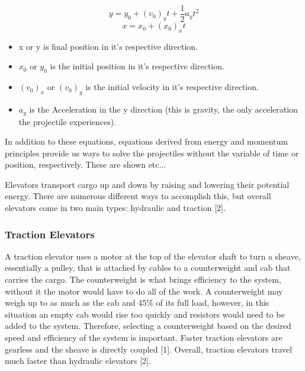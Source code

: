 \documentclass[fleqn,12pt]{project}
\begin{document}
\begin{equation}
	y = y_0 + (v_0)_yt + \frac{1}{2}a_yt^2
\label{eq:y}
\end{equation}
\begin{equation}
	x = x_0 + (x_0)_xt
\label{eq:x}
\end{equation}
\begin{itemize}
\item x or y is final position in it's respective direction.
\item $x_0$ or $y_0$ is the initial position in it's respective direction.
\item $(v_0)_x$ or $(v_0)_y$ is the initial velocity in it's respective direction.
\item $a_y$ is the Acceleration in the y direction (this is gravity, the only acceleration the projectile experiences).
\end{itemize}


In addition to these equations, equations derived from energy and momentum principles provide us ways to solve the projectiles without the variable of time or position, respectively. These are shown etc...

Elevators transport cargo up and down by raising and lowering their potential energy. There are numerous different ways to accomplish this, but overall elevators come in two main types: hydraulic and traction [2].

\subsubsection{Traction Elevators}
A traction elevator uses a motor at the top of the elevator shaft to turn a sheave, essentially a pulley, that is attached by cables to a counterweight and cab that carries the cargo. The counterweight is what brings efficiency to the system, without it the motor would have to do all of the work. A counterweight may weigh up to as much as the cab and 45\% of its full load, however, in this situation an empty cab would rise too quickly and resistors would need to be added to the system. Therefore, selecting a counterweight based on the desired speed and efficiency of the system is important. Faster traction elevators are gearless and the sheave is directly coupled [1]. Overall, traction elevators travel much faster than hydraulic elevators [2].
\end{document}
